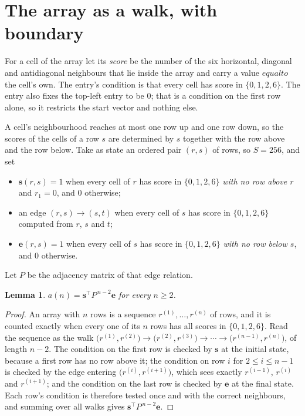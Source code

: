 \documentclass[11pt,a4paper]{article}
\theoremstyle{plain}
\newtheorem{lemma}[theorem]{Lemma}
\theoremstyle{definition}
\begin{document}
\section{The array as a walk, with boundary}

For a cell of the array let its \emph{score} be the number of the six horizontal, diagonal and antidiagonal neighbours that lie inside
the array and carry a value $equal to$ the cell's own. The entry's condition is that every cell
has score in $\{0,1,2,6\}$. The entry also fixes the top-left entry to be $0$; that is a condition on the first row alone, so it restricts the start vector and nothing else.

A cell's neighbourhood reaches at most one row up and one row down, so the scores of the
cells of a row $s$ are determined by $s$ together with the row above and the row below.
Take as state an ordered pair $(r,s)$ of rows, so $S=256$, and set
\begin{itemize}
\item $\mathbf{s}(r,s)=1$ when every cell of $r$ has score in $\{0,1,2,6\}$ \emph{with no row
above $r$} and $r_1=0$, and $0$ otherwise;
\item an edge $(r,s)\to(s,t)$ when every cell of $s$ has score in $\{0,1,2,6\}$ computed from
$r$, $s$ and $t$;
\item $\mathbf{e}(r,s)=1$ when every cell of $s$ has score in $\{0,1,2,6\}$ \emph{with no row
below $s$}, and $0$ otherwise.
\end{itemize}
Let $P$ be the adjacency matrix of that edge relation.

\begin{lemma}\label{lem:walk}
$a(n)=\mathbf{s}^{\!\top}P^{\,n-2}\mathbf{e}$ for every $n\ge2$.
\end{lemma}

\begin{proof}
An array with $n$ rows is a sequence $r^{(1)},\dots,r^{(n)}$ of rows, and it is counted
exactly when every one of its $n$ rows has all scores in $\{0,1,2,6\}$. Read the sequence as the
walk $\bigl(r^{(1)},r^{(2)}\bigr)\to\bigl(r^{(2)},r^{(3)}\bigr)\to\cdots\to
\bigl(r^{(n-1)},r^{(n)}\bigr)$, of length $n-2$. The condition on the first row is
checked by $\mathbf{s}$ at the initial state, because a first row has no row above it; the
condition on row $i$ for $2\le i\le n-1$ is checked by the edge entering
$\bigl(r^{(i)},r^{(i+1)}\bigr)$, which sees exactly $r^{(i-1)}$, $r^{(i)}$ and
$r^{(i+1)}$; and the condition on the last row is checked by $\mathbf{e}$ at the final
state. Each row's condition is therefore tested once and with the correct neighbours, and
summing over all walks gives $\mathbf{s}^{\!\top}P^{\,n-2}\mathbf{e}$.
\end{proof}
\end{document}
